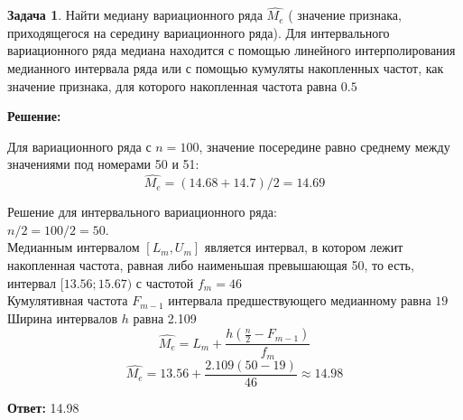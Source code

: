 \documentclass[a4paper,12pt]{article}
\theoremstyle{definition}
\newtheorem{problem}{Задача}\setlength{\parindent}{0pt}
\newenvironment{solution}
{\begin{shaded}\textbf{Решение:}\par\setlength{\parindent}{0pt}}
{\end{shaded}}
\newenvironment{answer}
{\par\noindent\textbf{Ответ:} }
{\par}
\begin{document}
\vspace{8pt}
\begin{problem}
    Найти медиану вариационного ряда \(\hat{M_e}\) ( значение признака, приходящегося на
    середину вариационного ряда). Для интервального вариационного ряда медиана
    находится с помощью линейного интерполирования медианного интервала ряда
    или с помощью кумуляты накопленных частот, как значение признака, для
    которого накопленная частота равна \(0.5\)
    
        \begin{solution}
            Для вариационного ряда с \( n = 100 \), значение посередине равно среднему между значениями 
            под номерами 50 и 51:
            \[ \hat{M_e} = (14.68 + 14.7) / 2 = 14.69\]

            Решение для интервального вариационного ряда:\\
            \(n/2 = 100/2 = 50.\)\\
            Медианным интервалом \([L_m, U_m]\) является интервал, в котором лежит накопленная частота,
            равная либо наименьшая превышающая 50, то есть, интервал \([13.56; 15.67)\)
            с частотой \(f_m = 46\)\\
            Кумулятивная частота \(F_{m-1}\) интервала предшествующего медианному равна \(19\)
            Ширина интервалов \(h\) равна 2.109 \\


            \[ \hat{M_e} = L_m + \frac{h(\frac{n}{2} - F_{m-1})}{f_m} \]
            \[ \hat{M_e} = 13.56 + \frac{2.109(50 - 19)}{46} \approx 14.98\]
            
        \end{solution}
    
        \begin{answer}
            14.98
        \end{answer}
    
    \end{problem}
\end{document}
